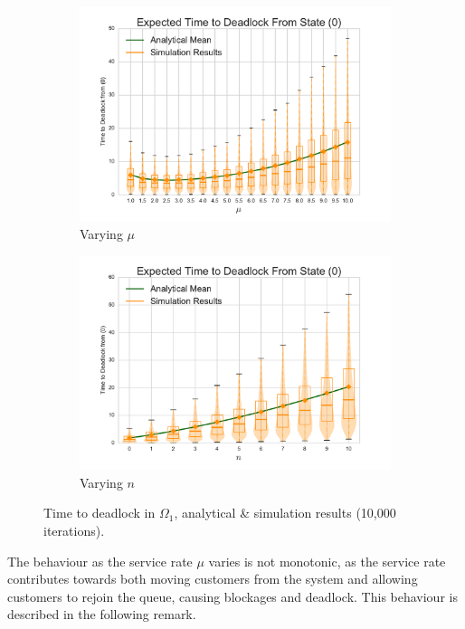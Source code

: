 \documentclass{article}
\begin{document}
\begin{figure}[!htbp]
\begin{center}
\begin{subfigure}[b]{0.35\textwidth}
  \includegraphics[width=\textwidth]{images/varymu}
  \caption{Varying $\mu$}
  \label{fig:timestodeadlock_mu}
\end{subfigure}
\begin{subfigure}[b]{0.35\textwidth}
  \includegraphics[width=\textwidth]{images/varyn}
  \caption{Varying $n$}
  \label{fig:timestodeadlock_n}
\end{subfigure}
\end{center}
\caption{Time to deadlock in $\Omega_1$, analytical \& simulation results (10,000 iterations).}
\label{fig:timestodeadlock}
\end{figure}

The behaviour as the service rate $\mu$ varies is not monotonic, as the service rate contributes towards both moving customers from the system and allowing customers to rejoin the queue, causing blockages and deadlock.
This behaviour is described in the following remark.\\
\end{document}
